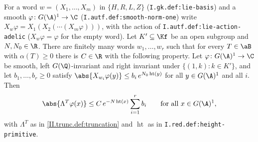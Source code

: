 For a word $w=(X_1,\dots,X_m)$ in $\{H,R,L,Z\}$ (\texttt{I.gk.def:lie-basis}) and a smooth $\varphi\colon G(\A)^1\to\C$ (\texttt{I.autf.def:smooth-norm-one}) write
$X_w\varphi=X_1(X_2(\cdots(X_m\varphi)))$, with the action of \texttt{I.autf.def:lie-action-adelic} ($X_w\varphi=\varphi$ for the empty word). Let $K'\subseteq\Kf$ be an open
subgroup and $N,N_0\in\R$. There are finitely many words $w_1,\dots,w_r$ such that for every $T\in\aB$ with $\alpha(T)\ge0$ there is $C\in\R$ with the following property.
Let $\varphi\colon G(\A)^1\to\C$ be smooth, left $G(\Q)$-invariant and right invariant under $\{(1,k):k\in K'\}$, and let $b_1,\dots,b_r\ge0$ satisfy
$\abs{X_{w_i}\varphi(y)}\le b_i\,e^{N_0\operatorname{ht}(y)}$ for all $y\in G(\A)^1$ and all $i$. Then
\[
  \abs{\Lambda^T\varphi(x)}\le C\,e^{-N\operatorname{ht}(x)}\sum_{i=1}^rb_i\qquad\text{for all }x\in G(\A)^1,
\]
with $\Lambda^T$ as in \cref{II.trunc.def:truncation} and $\operatorname{ht}$ as in \texttt{I.red.def:height-primitive}.
